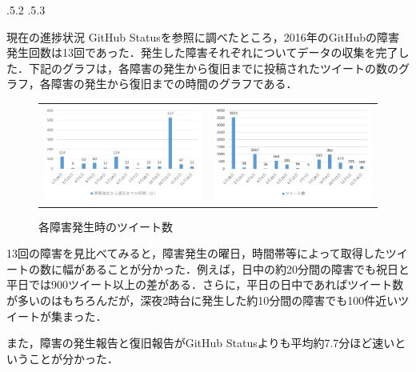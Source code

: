 \documentclass[uplatex]{jsarticle}
\makeatletter
\renewcommand{\section}{%
    \if@slide\clearpage\fi
    \@startsection{section}{1}{\z@}%
    {\Cvs \@plus.5\Cdp \@minus.2\Cdp}%
    {.5\Cvs \@plus.3\Cdp}%
    {\normalfont\raggedright}}
\makeatother
\begin{document}
\section{現在の進捗状況}
GitHub Statusを参照に調べたところ，2016年のGitHubの障害発生回数は13回であった．発生した障害それぞれについてデータの収集を完了した．下記のグラフは，各障害の発生から復旧までに投稿されたツイートの数のグラフ，各障害の発生から復旧までの時間のグラフである．
\begin{center}
\begin{figure}[htbp]
\begin{tabular}{cc}
\begin{minipage}[t]{0.5\hsize}
 \centering
 \includegraphics[width=7.5cm,clip]{graph1.pdf}
 \caption{各障害の発生から復旧までの時間}
 \label{ラベル1}
\end{minipage} &
\begin{minipage}[t]{0.5\hsize}
 \centering
 \includegraphics[width=7.5cm,clip]{graph2.pdf}
 \caption{各障害発生時のツイート数}
 \label{ラベル2}
\end{minipage}
\end{tabular}
\end{figure}
\end{center}

13回の障害を見比べてみると，障害発生の曜日，時間帯等によって取得したツイートの数に幅があることが分かった．例えば，日中の約20分間の障害でも祝日と平日では900ツイート以上の差がある．さらに，平日の日中であればツイート数が多いのはもちろんだが，深夜2時台に発生した約10分間の障害でも100件近いツイートが集まった．

また，障害の発生報告と復旧報告がGitHub Statusよりも平均約7.7分ほど速いということが分かった．
\end{document}

